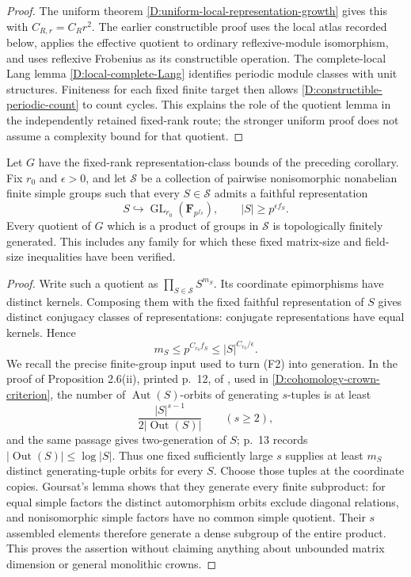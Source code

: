 \begin{proof}
The uniform theorem \ref{D:uniform-local-representation-growth}
gives this with \(C_{R,r}=C_Rr^2\).
The earlier constructible proof uses the local atlas recorded
below, applies the effective quotient to ordinary reflexive-module
isomorphism, and uses reflexive Frobenius as its constructible
operation. The complete-local Lang lemma
\ref{D:local-complete-Lang} identifies periodic module classes
with unit structures. Finiteness for each fixed finite target
then allows \ref{D:constructible-periodic-count} to count cycles.
This explains the role of the quotient lemma in the independently
retained fixed-rank route; the stronger uniform proof does not
assume a complexity bound for that quotient.
\end{proof}

\begin{corollary}
\label{D:bounded-matrix-simple-product}
Let \(G\) have the fixed-rank representation-class bounds of the
preceding corollary. Fix \(r_0\) and \(\epsilon>0\), and let
\(\mathcal S\) be a collection of pairwise nonisomorphic nonabelian
finite simple groups such that every \(S\in\mathcal S\) admits
a faithful representation
\[
 S\hookrightarrow\operatorname{GL}_{r_0}(\mathbf F_{p^{f_S}}),
 \qquad |S|\geq p^{\epsilon f_S}.
\]
Every quotient of \(G\) which is a product of groups in
\(\mathcal S\) is topologically finitely generated.
This includes any family for which these fixed matrix-size and
field-size inequalities have been verified.
\end{corollary}

\begin{proof}
Write such a quotient as \(\prod_{S\in\mathcal S}S^{m_S}\).
Its coordinate epimorphisms have distinct kernels.
Composing them with the fixed faithful representation of \(S\)
gives distinct conjugacy classes of representations: conjugate
representations have equal kernels. Hence
\[
 m_S\leq p^{C_{r_0}f_S}\leq |S|^{C_{r_0}/\epsilon}.
 \tag{F2}
\]
We recall the precise finite-group input used to turn (F2) into
generation. In the proof of Proposition 2.6(ii), printed p.~12,
of \cite{LucchiniMarionTracey2020D}, used in
\ref{D:cohomology-crown-criterion}, the number of
\(\operatorname{Aut}(S)\)-orbits of generating \(s\)-tuples is at
least
\[
 \frac{|S|^{s-1}}{2|\operatorname{Out}(S)|}\qquad(s\geq2),
\]
and the same passage gives two-generation of \(S\); p.~13 records
\(|\operatorname{Out}(S)|\leq\log |S|\).
Thus one fixed sufficiently large \(s\) supplies at least \(m_S\)
distinct generating-tuple orbits for every \(S\).
Choose those tuples at the coordinate copies.
Goursat's lemma shows that they generate every finite subproduct:
for equal simple factors the distinct automorphism orbits exclude
diagonal relations, and nonisomorphic simple factors have no
common simple quotient. Their \(s\) assembled elements therefore
generate a dense subgroup of the entire product.
This proves the assertion without claiming anything about
unbounded matrix dimension or general monolithic crowns.
\end{proof}

